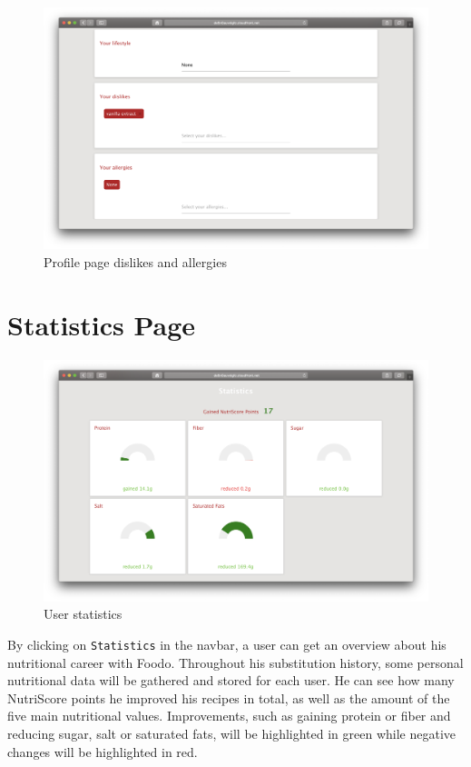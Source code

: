 \begin{figure}[H]
	\captionsetup{justification=centering}
	\begin{center}
		\includegraphics[scale=0.25]{Ressourcen/img/screenshots/screenshotP.png}
		\vspace{-2em}
		\caption{Profile page dislikes and allergies}
	\end{center}
\end{figure}

\section*{Statistics Page}
\vspace{-2em}
\begin{figure}[H]
	\captionsetup{justification=centering}
	\begin{center}
		\includegraphics[scale=0.30]{Ressourcen/img/screenshots/screenshotQ.png}
		\vspace{-3em}
		\caption{User statistics}
	\end{center}
\end{figure}
By clicking on \texttt{Statistics} in the navbar, a user can get an overview about his nutritional career with Foodo. Throughout his substitution history, some personal nutritional data will be gathered and stored for each user. He can see how many NutriScore points he improved his recipes in total, as well as the amount of the five main nutritional values. Improvements, such as gaining protein or fiber and reducing sugar, salt or saturated fats, will be highlighted in green while negative changes will be highlighted in red.


